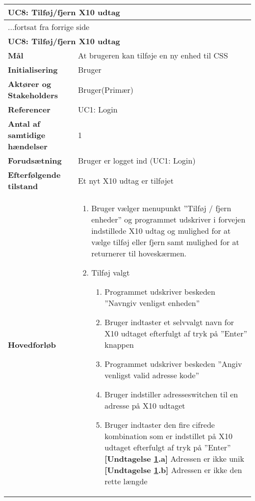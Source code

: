 \begin{center} \centering
	\begin{longtable}{|p{6cm}|p{8cm}|}
	\hline
		\multicolumn{2}{|l|}{\textbf{UC8: Tilføj/fjern X10 udtag}} \\\hline
		\endfirsthead
		
		\multicolumn{2}{l}{...fortsat fra forrige side} \\ \hline 
		\multicolumn{2}{|l|}{\textbf{UC8: Tilføj/fjern X10 udtag}} \\\hline
		\endhead		
		
		\textbf{Mål}							&At brugeren kan tilføje en ny enhed til CSS	\\\hline
		\textbf{Initialisering}				&Bruger					 					\\\hline
		\textbf{Aktører og Stakeholders}		&Bruger(Primær)								\\\hline
		\textbf{Referencer}					&UC1: Login									\\\hline
		\textbf{Antal af samtidige hændelser}&1 											\\\hline
		\textbf{Forudsætning}				&Bruger er logget ind (UC1: Login)			\\\hline
		\textbf{Efterfølgende tilstand}		&Et nyt X10 udtag er tilføjet 				\\\hline
		\textbf{Hovedforløb}					
			&\begin{enumerate}
				
		\item \label{uc8start} Bruger vælger menupunkt ''Tilføj / fjern enheder'' og programmet udskriver i forvejen indstillede X10 udtag og mulighed for at vælge tilføj eller fjern samt mulighed for at returnerer til hoveskærmen.
					
\item Tilføj valgt		
\begin{enumerate}
  \item \label{uc8indstilNavn} Programmet udskriver beskeden ''Navngiv venligst enheden''
  \item \label{uc8navn} Bruger indtaster et selvvalgt navn for X10 udtaget efterfulgt af tryk på ''Enter'' knappen

  \item \label{uc8indstilAdresse} Programmet udskriver beskeden ''Angiv venligst valid adresse kode''
				
  \item Bruger indstiller adresseswitchen til en adresse på X10 udtaget

  \item \label{uc8adresse} Bruger indtaster den fire cifrede kombination som er indstillet på X10 udtaget efterfulgt af tryk på ''Enter''
    \newline
    \textbf{[Undtagelse \ref{uc8adresse}.a]} Adressen er ikke unik
    \newline
    \textbf{[Undtagelse \ref{uc8adresse}.b]} Adressen er ikke den rette længde
						

\end{enumerate}
\end{enumerate}
\end{longtable}
\end{center}
